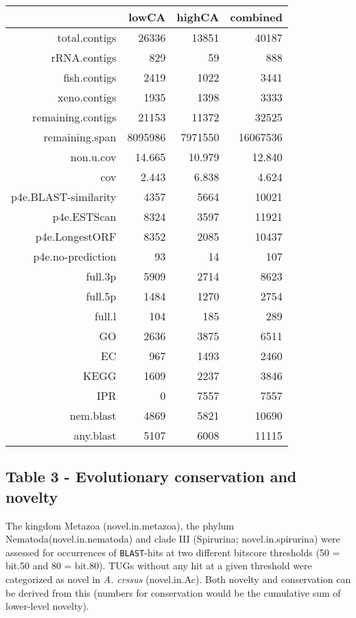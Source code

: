 \documentclass[10pt]{bmc_article}
\newenvironment{bmcformat}{\begin{raggedright}\baselineskip20pt\sloppy\setboolean{publ}{false}}{\end{raggedright}\baselineskip20pt\sloppy}
\begin{document}
\begin{bmcformat}
\begin{table}[ht]
\begin{center}
\begin{tabular}{rrrr}
  \hline
 & lowCA & highCA & combined \\ 
  \hline
total.contigs & 26336 & 13851 & 40187 \\ 
  rRNA.contigs & 829 & 59 & 888 \\ 
  fish.contigs & 2419 & 1022 & 3441 \\ 
  xeno.contigs & 1935 & 1398 & 3333 \\ 
  remaining.contigs & 21153 & 11372 & 32525 \\ 
  remaining.span & 8095986 & 7971550 & 16067536 \\ 
  non.u.cov & 14.665 & 10.979 & 12.840 \\ 
  cov & 2.443 & 6.838 & 4.624 \\ 
  p4e.BLAST-similarity & 4357 & 5664 & 10021 \\ 
  p4e.ESTScan & 8324 & 3597 & 11921 \\ 
  p4e.LongestORF & 8352 & 2085 & 10437 \\ 
  p4e.no-prediction & 93 & 14 & 107 \\ 
  full.3p & 5909 & 2714 & 8623 \\ 
  full.5p & 1484 & 1270 & 2754 \\ 
  full.l & 104 & 185 & 289 \\ 
  GO & 2636 & 3875 & 6511 \\ 
  EC & 967 & 1493 & 2460 \\ 
  KEGG & 1609 & 2237 & 3846 \\ 
  IPR & 0 & 7557 & 7557 \\ 
  nem.blast & 4869 & 5821 & 10690 \\ 
  any.blast & 5107 & 6008 & 11115 \\ 
   \hline
\end{tabular}
\end{center}
\end{table}
\subsection*{Table 3 - Evolutionary conservation and novelty}

The kingdom Metazoa (novel.in.metazoa), the phylum
Nematoda(novel.in.nematoda) and clade III (Spirurina;
novel.in.spirurina) were assessed for occurrences of
\texttt{BLAST}-hits at two different bitscore thresholds (50 = bit.50
and 80 = bit.80). TUGs without any hit at a given threshold were
categorized as novel in \textit{A. crssus} (novel.in.Ac).  Both
novelty and conservation can be derived from this (numbers for
conservation would be the cumulative sum of lower-level novelty).


\end{bmcformat}
\end{document}
